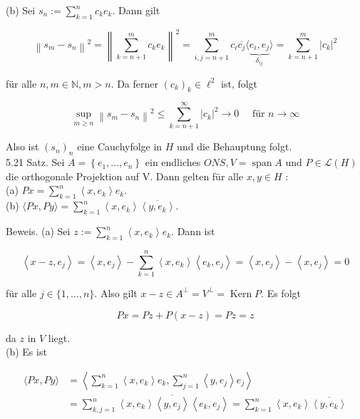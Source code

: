 \documentclass[10pt, letterpaper]{article}
\begin{document}
(b) Sei $s_{n}:=\sum_{k=1}^{n} c_{k} e_{k}$. Dann gilt

$$
\left\|s_{m}-s_{n}\right\|^{2}=\left\|\sum_{k=n+1}^{m} c_{k} e_{k}\right\|^{2}=\sum_{i, j=n+1}^{m} c_{i} \overline{c_{j}}\langle\underbrace{e_{i}, e_{j}}_{\delta_{i j}}\rangle=\sum_{k=n+1}^{m}\left|c_{k}\right|^{2}
$$

für alle $n, m \in \mathbb{N}, m>n$. Da ferner $\left(c_{k}\right)_{k} \in \ell^{2}$ ist, folgt

$$
\sup _{m \geq n}\left\|s_{m}-s_{n}\right\|^{2} \leq \sum_{k=n+1}^{\infty}\left|c_{k}\right|^{2} \rightarrow 0 \quad \text { für } n \rightarrow \infty
$$

Also ist $\left(s_{n}\right)_{n}$ eine Cauchyfolge in $H$ und die Behauptung folgt.\\
5.21 Satz. Sei $A=\left\{e_{1}, \ldots, e_{n}\right\}$ ein endliches $O N S, V=\operatorname{span} A$ und $P \in \mathcal{L}(H)$ die orthogonale Projektion auf V. Dann gelten für alle $x, y \in H$ :\\
(a) $P x=\sum_{k=1}^{n}\left\langle x, e_{k}\right\rangle e_{k}$.\\
(b) $\langle P x, P y\rangle=\sum_{k=1}^{n}\left\langle x, e_{k}\right\rangle \overline{\left\langle y, e_{k}\right\rangle}$.

Beweis. (a) Sei $z:=\sum_{k=1}^{n}\left\langle x, e_{k}\right\rangle e_{k}$. Dann ist

$$
\left\langle x-z, e_{j}\right\rangle=\left\langle x, e_{j}\right\rangle-\sum_{k=1}^{n}\left\langle x, e_{k}\right\rangle\left\langle e_{k}, e_{j}\right\rangle=\left\langle x, e_{j}\right\rangle-\left\langle x, e_{j}\right\rangle=0
$$

für alle $j \in\{1, \ldots, n\}$. Also gilt $x-z \in A^{\perp}=V^{\perp}=\operatorname{Kern} P$. Es folgt

$$
P x=P z+P(x-z)=P z=z
$$

da $z$ in $V$ liegt.\\
(b) Es ist

$$
\begin{aligned}
\langle P x, P y\rangle & =\left\langle\sum_{k=1}^{n}\left\langle x, e_{k}\right\rangle e_{k}, \sum_{j=1}^{n}\left\langle y, e_{j}\right\rangle e_{j}\right\rangle \\
& =\sum_{k, j=1}^{n}\left\langle x, e_{k}\right\rangle \overline{\left\langle y, e_{j}\right\rangle}\left\langle e_{k}, e_{j}\right\rangle=\sum_{k=1}^{n}\left\langle x, e_{k}\right\rangle \overline{\left\langle y, e_{k}\right\rangle}
\end{aligned}
$$
\end{document}
